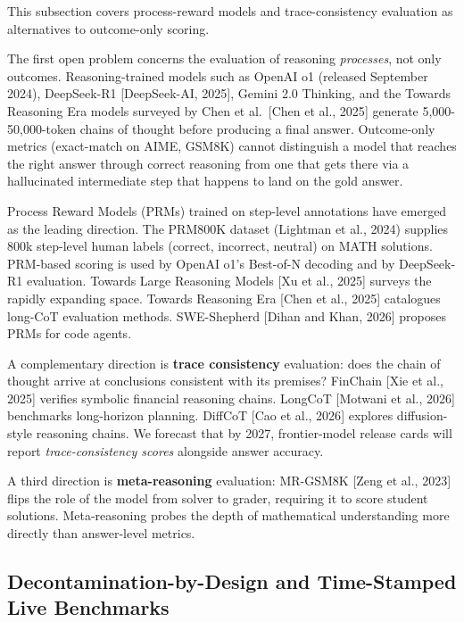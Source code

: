 This subsection covers process-reward models and trace-consistency evaluation as alternatives to outcome-only scoring.

The first open problem concerns the evaluation of reasoning \emph{processes}, not only outcomes. Reasoning-trained models such as OpenAI o1 (released September 2024), DeepSeek-R1 {[}DeepSeek-AI, 2025{]}, Gemini 2.0 Thinking, and the Towards Reasoning Era models surveyed by Chen et al.~{[}Chen et al., 2025{]} generate 5,000-50,000-token chains of thought before producing a final answer. Outcome-only metrics (exact-match on AIME, GSM8K) cannot distinguish a model that reaches the right answer through correct reasoning from one that gets there via a hallucinated intermediate step that happens to land on the gold answer.

Process Reward Models (PRMs) trained on step-level annotations have emerged as the leading direction. The PRM800K dataset (Lightman et al., 2024) supplies 800k step-level human labels (correct, incorrect, neutral) on MATH solutions. PRM-based scoring is used by OpenAI o1's Best-of-N decoding and by DeepSeek-R1 evaluation. Towards Large Reasoning Models {[}Xu et al., 2025{]} surveys the rapidly expanding space. Towards Reasoning Era {[}Chen et al., 2025{]} catalogues long-CoT evaluation methods. SWE-Shepherd {[}Dihan and Khan, 2026{]} proposes PRMs for code agents.

A complementary direction is \textbf{trace consistency} evaluation: does the chain of thought arrive at conclusions consistent with its premises? FinChain {[}Xie et al., 2025{]} verifies symbolic financial reasoning chains. LongCoT {[}Motwani et al., 2026{]} benchmarks long-horizon planning. DiffCoT {[}Cao et al., 2026{]} explores diffusion-style reasoning chains. We forecast that by 2027, frontier-model release cards will report \emph{trace-consistency scores} alongside answer accuracy.

A third direction is \textbf{meta-reasoning} evaluation: MR-GSM8K {[}Zeng et al., 2023{]} flips the role of the model from solver to grader, requiring it to score student solutions. Meta-reasoning probes the depth of mathematical understanding more directly than answer-level metrics.

\subsection{Decontamination-by-Design and Time-Stamped Live Benchmarks}\label{decontamination-by-design-and-time-stamped-live-benchmarks}

